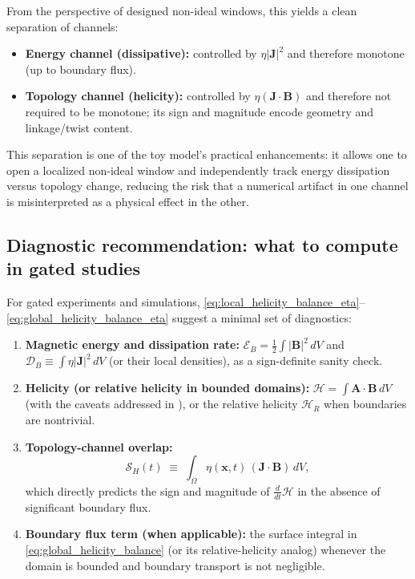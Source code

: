 \documentclass[11pt]{article}
\theoremstyle{plain}
\theoremstyle{definition}
\theoremstyle{remark}
\newcommand{\A}{\mathbf{A}}
\newcommand{\B}{\mathbf{B}}
\newcommand{\J}{\mathbf{J}}
\begin{document}
From the perspective of designed non-ideal windows, this yields a clean separation of channels:

\begin{itemize}[leftmargin=*]
  \item \textbf{Energy channel (dissipative):} controlled by $\eta|\J|^2$ and therefore monotone (up to
  boundary flux).
  \item \textbf{Topology channel (helicity):} controlled by $\eta(\J\cdot\B)$ and therefore not required
  to be monotone; its sign and magnitude encode geometry and linkage/twist content.
\end{itemize}

This separation is one of the toy model's practical enhancements: it allows one to open a localized
non-ideal window and independently track energy dissipation versus topology change, reducing the risk
that a numerical artifact in one channel is misinterpreted as a physical effect in the other.

\subsection{Diagnostic recommendation: what to compute in gated studies}\label{sec:result_helicity_diagnostics}
For gated experiments and simulations, \eqref{eq:local_helicity_balance_eta}--\eqref{eq:global_helicity_balance_eta}
suggest a minimal set of diagnostics:

\begin{enumerate}[leftmargin=*]
  \item \textbf{Magnetic energy and dissipation rate:}
  $\mathcal{E}_B=\frac12\int|\B|^2\,dV$ and
  $\mathcal{D}_B \equiv \int \eta|\J|^2\,dV$ (or their local densities), as a sign-definite sanity check.

  \item \textbf{Helicity (or relative helicity in bounded domains):}
  $\mathcal{H}=\int \A\cdot\B\,dV$ (with the caveats addressed in ),
  or the relative helicity $\mathcal{H}_R$ when boundaries are nontrivial.

  \item \textbf{Topology-channel overlap:}
  \begin{equation}\label{eq:overlap_integral}
    \mathcal{S}_H(t) \;\equiv\; \int_{\Omega}\eta(\mathbf{x},t)\,(\J\cdot\B)\,dV,
  \end{equation}
  which directly predicts the sign and magnitude of $\frac{d}{dt}\mathcal{H}$ in the absence of
  significant boundary flux.

  \item \textbf{Boundary flux term (when applicable):}
  the surface integral in \eqref{eq:global_helicity_balance} (or its relative-helicity analog) whenever
  the domain is bounded and boundary transport is not negligible.
\end{enumerate}
\end{document}
